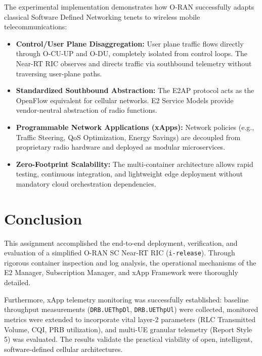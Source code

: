 \documentclass[11pt,a4paper]{article}
\begin{document}
The experimental implementation demonstrates how O-RAN successfully adapts classical Software Defined Networking tenets to wireless mobile telecommunications:
\begin{itemize}
    \item \textbf{Control/User Plane Disaggregation:} User plane traffic flows directly through O-CU-UP and O-DU, completely isolated from control loops. The Near-RT RIC observes and directs traffic via southbound telemetry without traversing user-plane paths.
    \item \textbf{Standardized Southbound Abstraction:} The E2AP protocol acts as the OpenFlow equivalent for cellular networks. E2 Service Models provide vendor-neutral abstraction of radio functions.
    \item \textbf{Programmable Network Applications (xApps):} Network policies (e.g., Traffic Steering, QoS Optimization, Energy Savings) are decoupled from proprietary radio hardware and deployed as modular microservices.
    \item \textbf{Zero-Footprint Scalability:} The multi-container architecture allows rapid testing, continuous integration, and lightweight edge deployment without mandatory cloud orchestration dependencies.
\end{itemize}

\section{Conclusion}
This assignment accomplished the end-to-end deployment, verification, and evaluation of a simplified O-RAN SC Near-RT RIC (\texttt{i-release}). Through rigorous container inspection and log analysis, the operational mechanisms of the E2 Manager, Subscription Manager, and xApp Framework were thoroughly detailed. 

Furthermore, xApp telemetry monitoring was successfully established: baseline throughput measurements (\texttt{DRB.UEThpDl}, \texttt{DRB.UEThpUl}) were collected, monitored metrics were extended to incorporate vital layer-2 parameters (RLC Transmitted Volume, CQI, PRB utilization), and multi-UE granular telemetry (Report Style 5) was evaluated. The results validate the practical viability of open, intelligent, software-defined cellular architectures.
\end{document}
